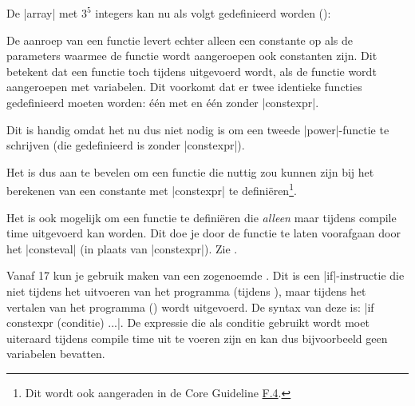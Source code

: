 \begin{cpplstShortInline}

De |array| met $3^5$ integers kan nu als volgt gedefinieerd worden ():


De aanroep van een  functie levert echter alleen een  constante op als de parameters waarmee de functie wordt aangeroepen ook  constanten zijn.
Dit betekent dat een  functie toch tijdens  uitgevoerd wordt, als de functie wordt aangeroepen met variabelen.
Dit voorkomt dat er twee identieke functies gedefinieerd moeten worden: één met en één zonder |constexpr|.

Dit is handig omdat het nu dus niet nodig is om een tweede |power|-functie te schrijven (die gedefinieerd is zonder |constexpr|).

Het is dus aan te bevelen om een functie die nuttig zou kunnen zijn bij het berekenen van een  constante met |constexpr| te definiëren\footnote{%
	Dit wordt ook aangeraden in de \Cpp{} Core Guideline \href{https://isocpp.github.io/CppCoreGuidelines/CppCoreGuidelines\#f4-if-a-function-might-have-to-be-evaluated-at-compile-time-declare-it-constexpr}{F.4}.
}.

Het is ook mogelijk om een functie te definiëren die \emph{alleen} maar tijdens compile time uitgevoerd kan worden.
Dit doe je door de functie te laten voorafgaan door het  |consteval| (in plaats van |constexpr|).
Zie .

\label{compiletimeif}
Vanaf \Cpp{}17 kun je gebruik maken van een zogenoemde \emph{}. 
Dit is een |if|-instructie die niet tijdens het uitvoeren van het programma (tijdens ), maar tijdens het vertalen van het programma () wordt uitgevoerd.
De syntax van deze  is: |if constexpr (conditie) ...|.
De expressie die als conditie gebruikt wordt moet uiteraard tijdens compile time uit te voeren zijn en kan dus bijvoorbeeld geen variabelen bevatten.



\end{cpplstShortInline}
